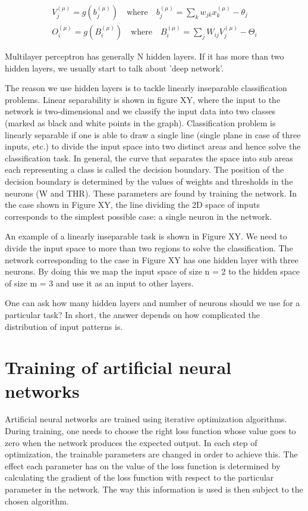 \begin{gather}
V_j^{(\mu)} = g(b_j^{(\mu)}) \quad \text{where} \quad b_j^{(\mu)} = \sum_{k} w_{jk} x_{k}^{(\mu)} - \theta_{j} \\
O_i^{(\mu)} = g(B_i^{(\mu)}) \quad \text{where} \quad B_i^{(\mu)} = \sum_{j} W_{ij} V_{j}^{(\mu)} - \Theta_{i} 
\end{gather}

Multilayer perceptron has generally N hidden layers. If it has more than two hidden layers, we usually start to talk about 'deep network'. 

The reason we use hidden layers is to tackle linearly inseparable classification problems. Linear separability is shown in figure XY, where the input to the network is two-dimensional and we classify the input data into two classes (marked as black and white points in the graph). Classification problem is linearly separable if one is able to draw a single line (single plane in case of three inputs, etc.) to divide the input space into two distinct areas and hence solve the classification task. In general, the curve that separates the space into sub areas each representing a class is called the decision boundary. The position of the decision boundary is determined by the values of weights and thresholds in the neurons (W and THR). These parameters are found by training the network. In the case shown in Figure XY, the line dividing the 2D space of inputs corresponds to the simplest possible case: a single neuron in the network.

An example of a linearly inseparable task is shown in Figure XY. We need to divide the input space to more than two regions to solve the classification. The network corresponding to the case in Figure XY has one hidden layer with three neurons. By doing this we map the input space of size n = 2 to the hidden space of size m = 3 and use it as an input to other layers.

One can ask how many hidden layers and number of neurons should we use for a particular task? In short, the answer depends on how complicated the distribution of input patterns is.

\section{Training of artificial neural networks}

Artificial neural networks are trained using iterative optimization algorithms. During training, one needs to choose the right loss function whose value goes to zero when the network produces the expected output. In each step of optimization, the trainable parameters are changed in order to achieve this. The effect each parameter has on the value of the loss function is determined by calculating the gradient of the loss function with respect to the particular parameter in the network. The way this information is used is then subject to the chosen algorithm. 

